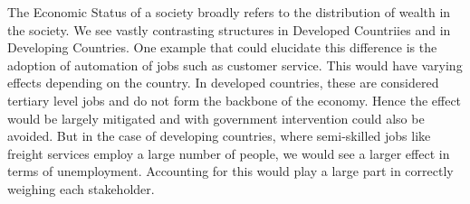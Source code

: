 \begin{itemize}
\begin{pointenv}
The Economic Status of a society broadly refers to the distribution of wealth in the society. We see vastly contrasting structures in Developed Countriies and in Developing Countries. One example that could elucidate this difference is the adoption of automation of jobs such as customer service. This would have varying effects depending on the country. In developed countries, these are considered tertiary level jobs and do not form the backbone of the economy. Hence the effect would be largely mitigated and with government intervention could also be avoided. But in the case of developing countries, where semi-skilled jobs like freight services employ a large number of people, we would see a larger effect in terms of unemployment. Accounting for this would play a large part in correctly weighing each stakeholder.
\end{pointenv}
    \end{itemize}

